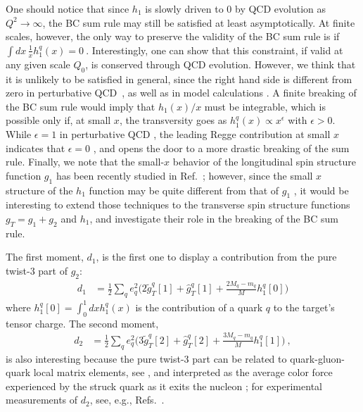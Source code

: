 \documentclass[preprintnumbers,floatfix,nofootinbib]{revtex4}
\newcommand{\mj}{M_q}
\newcommand{\mq}{m_q}
\begin{document}
One should notice that since $h_1$ is slowly driven to 0 by QCD evolution as $Q^2 \to \infty$, the BC sum rule may still be satisfied at least asymptotically. At finite scales, however, the only way to preserve the validity of the BC sum rule is if
$
   \int dx\, \frac{1}{x} h_1^q(x) = 0 \ .
\label{eq:ABsumrule}
$
Interestingly, one can show that this constraint, if valid at any given scale
$Q_0$, is conserved through QCD evolution. However, we think that it is unlikely to be satisfied in general, since the right hand side is different from zero
in perturbative QCD~\cite{Kundu:2001pk}, as well as in model calculations \cite{Schweitzer:2001sr,Wakamatsu:2007nc,Pasquini:2005dk,Cloet:2007em,Bacchetta:2008af,Bourrely:2010ng}.
A finite breaking of the BC sum rule would imply that $h_1(x)/x$ must be integrable, which is possible only if, at small $x$, the transversity goes as $h_1^q(x) \propto x^\epsilon$ with $\epsilon>0$. While $\epsilon=1$ in perturbative QCD \cite{Hayashigaki:1997dn,Vogelsang:1997ak}, the leading Regge contribution at small $x$ indicates that $\epsilon = 0$  \cite{Kirschner:1996jj}, and opens the door to a more drastic breaking of the sum rule.
Finally, we note that the small-$x$ behavior of the longitudinal spin structure function $g_1$ has been recently studied in Ref.~\cite{Kovchegov:2016zex}; however, since the small $x$ structure of the $h_1$ function may be quite different from that of $g_1$ \cite{Kirschner:1996jj},
it would be interesting to extend those techniques to the transverse spin structure functions $g_T=g_1+g_2$ and $h_1$, and investigate their role in the breaking of the BC sum rule.

The first moment, $d_1$, is the first one to display a contribution from the pure twist-3 part of $g_2$:
\begin{align}
  d_1 & = \frac12 \sum_q e_q^2 \bigg( 2 \tilde g_T^q[1] + \hat g_T^q[1] 
    + \frac{2\mj-\mq}{M} h_1^q[0] \bigg)
\label{e:d1}
\end{align}
where $h_1^q[0] = \int_0^1 dx h_1^q(x)$ is the contribution of a quark $q$ to the target's tensor charge. The second moment,
\begin{align}
  d_2 & = \frac12 \sum_q e_q^2 \bigg( 3 \tilde g_T^q[2] + \hat g_T^q[2] 
    + \frac{3\mj-\mq}{M} h_1^q[1] \bigg) \ ,
\end{align}
is also interesting because the pure twist-3 part can be related to quark-gluon-quark local matrix elements, see \cite{Jaffe:1996zw}, and
interpreted as the average color force experienced by the struck quark as
it exits the nucleon \cite{Burkardt:2012sd}; for experimental
measurements of $d_2$, see, e.g., Refs.~\cite{Anthony:2002hy,Slifer:2008xu,Solvignon:2013yun,Posik:2014usi,Flay:2016wie}. 
\end{document}
